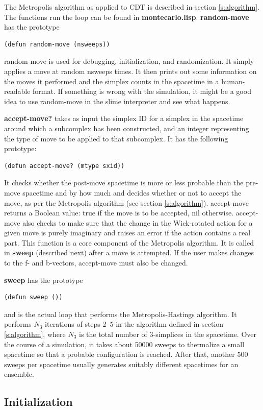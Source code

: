 \message{ !name(programmers_guide.tex)}\documentclass[12pt]{article}
\begin{document}
The Metropolis algorithm as applied to CDT is described in section
\ref{s:algorithm}. The functions run the loop can be found in
\textbf{montecarlo.lisp}. \textbf{random-move} has the prototype 
\begin{lstlisting}
(defun random-move (nsweeps))
\end{lstlisting}
random-move is used for debugging, initialization, and
randomization. It simply applies a move at random nsweeps times. It
then prints out some information on the moves it performed and the
simplex counts in the spacetime in a human-readable format. If
something is wrong with the simulation, it might be a good idea to use
random-move in the slime interpreter and see what happens.

\textbf{accept-move?} takes as input the simplex ID for a simplex in
the spacetime around which a subcomplex has been constructed, and an
integer representing the type of move to be applied to that
subcomplex. It has the following prototype:
\begin{lstlisting}
(defun accept-move? (mtype sxid))
\end{lstlisting}
It checks whether the post-move spacetime is more or less probable
than the pre-move spacetime and by how much and decides whether or not
to accept the move, as per the Metropolis algorithm (see section
\ref{s:algorithm}). accept-move returns a Boolean value: true if the
move is to be accepted, nil otherwise. accept-move also checks to make
sure that the change in the Wick-rotated action for a given move is
purely imaginary and raises an error if the action contains a real
part. This function is a core component of the Metropolis
algorithm. It is called in \textbf{sweep} (described next) after a
move is attempted. If the user makes changes to the f- and b-vectors,
accept-move must also be changed.

\textbf{sweep} has the prototype 
\begin{lstlisting}
(defun sweep ())
\end{lstlisting}
and is the actual loop that performs the Metropolis-Hastings
algorithm. It performs $N_3$ iterations of steps 2--5 in the algorithm
defined in section \ref{s:algorithm}, where $N_3$ is the total number
of 3-simplices in the spacetime. Over the course of a simulation, it
takes about 50000 sweeps to thermalize a small spacetime so that a
probable configuration is reached. After that, another 500 sweeps per
spacetime usually generates suitably different spacetimes for an
ensemble.

\subsection{Initialization}
\label{s:initialization}
\end{document}

